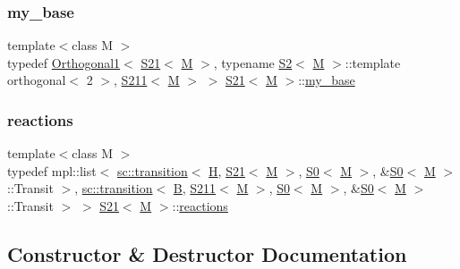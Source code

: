 \subsubsection{\texorpdfstring{my\+\_\+base}{my\_base}}
{\footnotesize\ttfamily template$<$class M $>$ \\
typedef \mbox{\hyperlink{struct_orthogonal1}{Orthogonal1}}$<$ \mbox{\hyperlink{struct_s21}{S21}}$<$ \mbox{\hyperlink{struct_m}{M}} $>$, typename \mbox{\hyperlink{struct_s2}{S2}}$<$ \mbox{\hyperlink{struct_m}{M}} $>$\+::template orthogonal$<$ 2 $>$, \mbox{\hyperlink{struct_s211}{S211}}$<$ \mbox{\hyperlink{struct_m}{M}} $>$ $>$ \mbox{\hyperlink{struct_s21}{S21}}$<$ \mbox{\hyperlink{struct_m}{M}} $>$\+::\mbox{\hyperlink{struct_s21_a68aa19cac7d8f172f0f12e855642b983}{my\+\_\+base}}}

\mbox{\label{struct_s21_ab1a7f8bf2e6fbc04a7b4c23ac60f6f4c}} 
\subsubsection{\texorpdfstring{reactions}{reactions}}
{\footnotesize\ttfamily template$<$class M $>$ \\
typedef mpl\+::list$<$ \mbox{\hyperlink{classboost_1_1statechart_1_1transition}{sc\+::transition}}$<$ \mbox{\hyperlink{struct_h}{H}}, \mbox{\hyperlink{struct_s21}{S21}}$<$ \mbox{\hyperlink{struct_m}{M}} $>$, \mbox{\hyperlink{struct_s0}{S0}}$<$ \mbox{\hyperlink{struct_m}{M}} $>$, \&\mbox{\hyperlink{struct_s0}{S0}}$<$ \mbox{\hyperlink{struct_m}{M}} $>$\+::Transit $>$, \mbox{\hyperlink{classboost_1_1statechart_1_1transition}{sc\+::transition}}$<$ \mbox{\hyperlink{struct_b}{B}}, \mbox{\hyperlink{struct_s211}{S211}}$<$ \mbox{\hyperlink{struct_m}{M}} $>$, \mbox{\hyperlink{struct_s0}{S0}}$<$ \mbox{\hyperlink{struct_m}{M}} $>$, \&\mbox{\hyperlink{struct_s0}{S0}}$<$ \mbox{\hyperlink{struct_m}{M}} $>$\+::Transit $>$ $>$ \mbox{\hyperlink{struct_s21}{S21}}$<$ \mbox{\hyperlink{struct_m}{M}} $>$\+::\mbox{\hyperlink{struct_s21_ab1a7f8bf2e6fbc04a7b4c23ac60f6f4c}{reactions}}}



\subsection{Constructor \& Destructor Documentation}
\mbox{\label{struct_s21_a633679618bd39ff85376a36429815c16}} 
